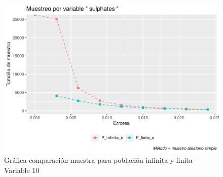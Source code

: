 \documentclass[
]{article}
\begin{document}
\begin{figure}
\centering
\includegraphics{1_examen_solucion_files/figure-latex/grafica va10-1.pdf}
\caption{Gráfica comparación muestra para población infinita y finita
Variable 10}
\end{figure}
\end{document}
